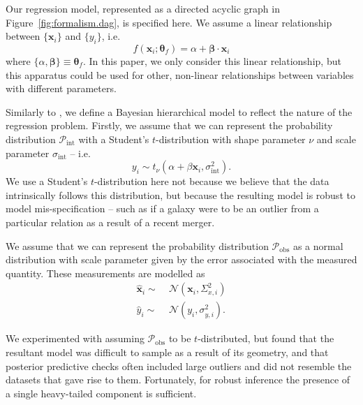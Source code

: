 \documentclass[fleqn,usenatbib]{rasti}
\newcommand{\studentt}[2]{t_\nu \left( #1, #2 \right)}
\newcommand{\depvar}{y_i}
\newcommand{\indepvars}{\boldsymbol{x}_i}
\newcommand{\obsdep}{\hat{y}_i}
\newcommand{\obsindep}{\hat{\boldsymbol{x}}_i}
\newcommand{\indepcov}{\Sigma_{x, i}}
\newcommand{\deperr}{\sigma_{y, i}}
\newcommand{\intscttr}{\sigma_{\text{int}}}
\newcommand{\intercept}{\alpha}
\newcommand{\covariate}{\beta}
\begin{document}
Our regression model, represented as a directed acyclic graph in
Figure~\ref{fig:formalism.dag}, is specified here. We assume a linear
relationship between
$\{\boldsymbol{x}_i\}$ and $\{y_i\}$, i.e.\
\begin{equation}
    f(\boldsymbol{x}_i; \boldsymbol{\theta}_f) =
        \alpha + \boldsymbol{\beta} \cdot \boldsymbol{x}_i
\end{equation}
where $\{\alpha, \boldsymbol{\beta}\} \equiv \boldsymbol{\theta}_f$. In this
paper, we only consider this linear relationship, but this apparatus could be
used for other, non-linear relationships between variables with different
parameters.

Similarly to \citet{Kelly:2007}, we define a Bayesian hierarchical model to
reflect the nature of the regression problem. Firstly, we assume that we can
represent the probability distribution $\mathcal P_{\text{int}}$ with a
Student's $t$-distribution with shape parameter $\nu$ and scale parameter
$\sigma_{\text{int}}$ -- i.e.\
\begin{equation}
\depvar \sim \studentt{\intercept + \covariate \indepvars}{\intscttr^2}.
\end{equation}
We use a Student's $t$-distribution here not because we believe that the data
intrinsically follows this distribution, but because the resulting model is
robust to model mis-specification -- such as if a galaxy were
to be an outlier from a particular relation as a result of a recent merger.

We assume that we can represent the probability distribution
$\mathcal P_{\text{obs}}$ as a normal distribution with scale parameter given by
the error associated with the measured quantity. These measurements are modelled
as
\begin{align}
    \obsindep \sim&\; \mathcal N\left({\indepvars}, \indepcov^2\right) \\
    \obsdep \sim&\; \mathcal N\left({\depvar}, \deperr^2\right).
\end{align}

We experimented with assuming $\mathcal P_{\text{obs}}$ to be $t$-distributed,
but found that the resultant model was difficult to sample as a result of its
geometry, and that posterior predictive checks often included large outliers and
did not resemble the datasets that gave rise to them.  Fortunately, for robust
inference the presence of a single heavy-tailed component is sufficient.
\end{document}

